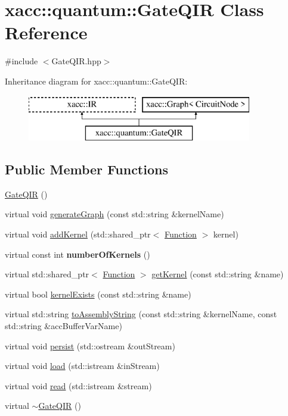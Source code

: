 \hypertarget{a00113}{}\section{xacc\+:\+:quantum\+:\+:Gate\+Q\+IR Class Reference}
\label{a00113}


{\ttfamily \#include $<$Gate\+Q\+I\+R.\+hpp$>$}

Inheritance diagram for xacc\+:\+:quantum\+:\+:Gate\+Q\+IR\+:\begin{figure}[H]
\begin{center}
\leavevmode
\includegraphics[height=2.000000cm]{a00113}
\end{center}
\end{figure}
\subsection*{Public Member Functions}
\begin{DoxyCompactItemize}
\item 
\hyperlink{a00113_afb99f610a6b123538c659169c131a634}{Gate\+Q\+IR} ()
\item 
virtual void \hyperlink{a00113_ad1ddd6105346dd9fc78648fd812285ed}{generate\+Graph} (const std\+::string \&kernel\+Name)
\item 
virtual void \hyperlink{a00113_aa6ed2cf2cbcfec8105c327a4fa95346f}{add\+Kernel} (std\+::shared\+\_\+ptr$<$ \hyperlink{a00106}{Function} $>$ kernel)
\item 
virtual const int {\bfseries number\+Of\+Kernels} ()\hypertarget{a00113_aca6be85526b14f500e7f98954dd6da5c}{}\label{a00113_aca6be85526b14f500e7f98954dd6da5c}

\item 
virtual std\+::shared\+\_\+ptr$<$ \hyperlink{a00106}{Function} $>$ \hyperlink{a00113_a194758b6edcc3ae0c7fe8004f9bfe690}{get\+Kernel} (const std\+::string \&name)
\item 
virtual bool \hyperlink{a00113_a692f95099caa7c024110a3f035941dca}{kernel\+Exists} (const std\+::string \&name)
\item 
virtual std\+::string \hyperlink{a00113_a7153f7e9f516d43af3d5d4f95d60bd86}{to\+Assembly\+String} (const std\+::string \&kernel\+Name, const std\+::string \&acc\+Buffer\+Var\+Name)
\item 
virtual void \hyperlink{a00113_a40e1d07e4dfd3794ef53fca3cdbdca61}{persist} (std\+::ostream \&out\+Stream)
\item 
virtual void \hyperlink{a00113_a07f26eeb362ac480d20da6cdc8c8fb39}{load} (std\+::istream \&in\+Stream)
\item 
virtual void \hyperlink{a00113_a26019e2f1e13e64645e29aee86ac58b1}{read} (std\+::istream \&stream)
\item 
virtual \hyperlink{a00113_ac88db03f1dd29e2d36aaa6c01a130008}{$\sim$\+Gate\+Q\+IR} ()
\end{DoxyCompactItemize}
